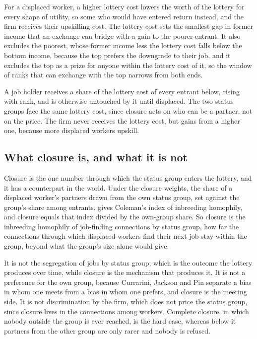 \documentclass[10pt]{article}
\begin{document}
For a displaced worker, a higher lottery cost lowers the worth of the lottery for every shape of utility, so some who would have entered return instead, and the firm receives their upskilling cost. The lottery cost sets the smallest gap in former income that an exchange can bridge with a gain to the poorer entrant. It also excludes the poorest, whose former income less the lottery cost falls below the bottom income, because the top prefers the downgrade to their job, and it excludes the top as a prize for anyone within the lottery cost of it, so the window of ranks that can exchange with the top narrows from both ends.

A job holder receives a share of the lottery cost of every entrant below, rising with rank, and is otherwise untouched by it until displaced. The two status groups face the same lottery cost, since closure acts on who can be a partner, not on the price. The firm never receives the lottery cost, but gains from a higher one, because more displaced workers upskill.

\subsection{What closure is, and what it is not}
Closure is the one number through which the status group enters the lottery, and it has a counterpart in the world. Under the closure weights, the share of a displaced worker's partners drawn from the own status group, set against the group's share among entrants, gives Coleman's index of inbreeding homophily, and closure equals that index divided by the own-group share. So closure is the inbreeding homophily of job-finding connections by status group, how far the connections through which displaced workers find their next job stay within the group, beyond what the group's size alone would give.

It is not the segregation of jobs by status group, which is the outcome the lottery produces over time, while closure is the mechanism that produces it. It is not a preference for the own group, because Currarini, Jackson and Pin separate a bias in whom one meets from a bias in whom one prefers, and closure is the meeting side. It is not discrimination by the firm, which does not price the status group, since closure lives in the connections among workers. Complete closure, in which nobody outside the group is ever reached, is the hard case, whereas below it partners from the other group are only rarer and nobody is refused.
\end{document}
